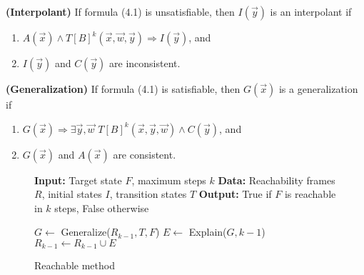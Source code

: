 \vspace{\baselineskip}
\begin{definition}{\textbf{(Interpolant)}}
    \cite{7886665} If formula (4.1) is unsatisfiable, then $I(\vec{y})$ is an interpolant if
    \label{interpolation}
    \begin{enumerate}
        \item \( A(\vec{x}) \land T[B]^k(\vec{x}, \vec{w}, \vec{y}) \Rightarrow I(\vec{y}) \), and
        \item \( I(\vec{y}) \) and \( C(\vec{y}) \) are inconsistent.
    \end{enumerate}
\end{definition}

\vspace{\baselineskip}
\begin{definition}{\textbf{(Generalization)}}
    \cite{7886665} If formula (4.1) is satisfiable, then $G(\vec{x})$ is a generalization if
    \label{generalization}
    \begin{enumerate}
        \item $G(\vec{x}) \Rightarrow \exists \vec{y}, \vec{w}$  $T[B]^k(\vec{x}, \vec{y}, \vec{w}) \wedge C(\vec{y})$, and
        \item $G(\vec{x})$ and $A(\vec{x})$ are consistent.
    \end{enumerate}
\end{definition}

\renewcommand{\figurename}{Algorithm}
\begin{figure}[h]
    \begin{mdframed}
        \begin{algorithmic}[1]
            \State \textbf{Input:} Target state $F$, maximum steps $k$
            \State \textbf{Data:} Reachability frames $R$, initial states $I$, transition states $T$
            \State \textbf{Output:} True if $F$ is reachable in $k$ steps, False otherwise

                \State {}
            \EndIf

                    \State $G \gets$ Generalize($R_{k-1}, T, F$)
                        \State {}
                    \Else
                        \State $E \gets$ Explain($G, k-1$)
                        \State $R_{k-1} \gets R_{k-1} \cup E$
                    \EndIf
                \Else
                    \State {}
                \EndIf
            \EndWhile

        \end{algorithmic}
    \end{mdframed}
    \caption{Reachable method}
    \label{alg:1}
\end{figure}


